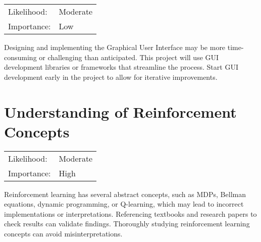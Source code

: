 \documentclass[]{final_report}
\begin{document}
\begin{center}
    \begin{tabular}{l l  }
    Likelihood: & Moderate \\
    Importance: & Low \\
    \end{tabular}
  \end{center}

Designing and implementing the Graphical User Interface may be more time-consuming or challenging than anticipated. This project will use GUI development libraries or frameworks that streamline the process. Start GUI development early in the project to allow for iterative improvements.

\section{Understanding of Reinforcement Concepts}

\begin{center}
    \begin{tabular}{l l  }
    Likelihood: & Moderate \\
    Importance: & High \\
    \end{tabular}
  \end{center}

Reinforcement learning has several abstract concepts, such as MDPs, Bellman equations, dynamic programming, or Q-learning, which may lead to incorrect implementations or interpretations. Referencing textbooks and research papers to check results can validate findings. Thoroughly studying reinforcement learning concepts can avoid misinterpretations.


\newpage



\label{endpage}
\end{document}
